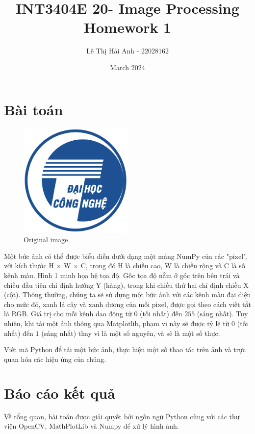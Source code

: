 \documentclass[a4paper]{article}
\begin{document}
{\fontsize{36}{12}\selectfont
\title{INT3404E 20- Image Processing Homework 1}
\author{Lê Thị Hải Anh - 22028162}
\date{March 2024}
}

\maketitle
\section{Bài toán}

\begin{figure}[ht]
  \centering
  \includegraphics[width=0.5\textwidth]{images/uet.png}
  \caption{Original image}
\end{figure}

Một bức ảnh có thể được biểu diễn dưới dạng một mảng NumPy của các "pixel", với kích thước H × W × C, trong đó H là chiều cao, W là chiều rộng và C là số kênh màu. Hình 1 minh họa hệ tọa độ. Gốc tọa độ nằm ở góc trên bên trái và chiều đầu tiên chỉ định hướng Y (hàng), trong khi chiều thứ hai chỉ định chiều X (cột). Thông thường, chúng ta sẽ sử dụng một bức ảnh với các kênh màu đại diện cho mức đỏ, xanh lá cây và xanh dương của mỗi pixel, được gọi theo cách viết tắt là RGB. Giá trị cho mỗi kênh dao động từ $0$ (tối nhất) đến $255$ (sáng nhất). Tuy nhiên, khi tải một ảnh thông qua Matplotlib, phạm vi này sẽ được tỷ lệ từ $0$ (tối nhất) đến $1$ (sáng nhất) thay vì là một số nguyên, và sẽ là một số thực.

Viết mã Python để tải một bức ảnh, thực hiện một số thao tác trên ảnh và trực quan hóa các hiệu ứng của chúng.

\clearpage
\section{Báo cáo kết quả}
Về tổng quan, bài toán được giải quyết bởi ngồn ngữ Python cùng với các thư viện OpenCV, MathPlotLib và Numpy để xử lý hình ảnh.
\end{document}
